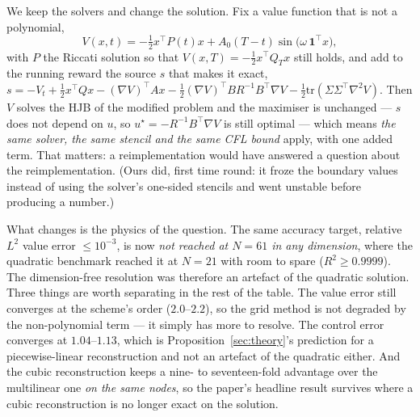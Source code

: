 \documentclass[conference]{IEEEtran}
\begin{document}
We keep the solvers and change the solution. Fix a value function that is not a polynomial,
\begin{equation}
V(x,t) = -\tfrac{1}{2}x^\top P(t)x + A_0 (T-t)\sin\!\big(\omega\,\mathbf{1}^\top x\big),
\end{equation}
with $P$ the Riccati solution so that $V(x,T) = -\tfrac12 x^\top Q_T x$ still holds, and add to the
running reward the source $s$ that makes it exact,
$s = -V_t + \tfrac12 x^\top Qx - (\nabla V)^\top Ax - \tfrac12(\nabla V)^\top BR^{-1}B^\top\nabla V
- \tfrac12\mathrm{tr}(\Sigma\Sigma^\top\nabla^2 V)$.
Then $V$ solves the HJB of the modified problem and the maximiser is unchanged --- $s$ does not
depend on $u$, so $u^\star = -R^{-1}B^\top\nabla V$ is still optimal --- which means \emph{the same
solver, the same stencil and the same CFL bound} apply, with one added term. That matters: a
reimplementation would have answered a question about the reimplementation. (Ours did, first time
round: it froze the boundary values instead of using the solver's one-sided stencils and went
unstable before producing a number.)

What changes is the physics of the question. The same accuracy target, relative $L^2$ value error
$\le 10^{-3}$, is now \emph{not reached at $N=61$ in any dimension}, where the quadratic benchmark
reached it at $N=21$ with room to spare ($R^2 \ge 0.9999$). The dimension-free resolution was
therefore an artefact of the quadratic solution. Three things are worth separating in the rest of
the table. The value error still converges at the scheme's order ($2.0$--$2.2$), so the grid method
is not degraded by the non-polynomial term --- it simply has more to resolve. The control error
converges at $1.04$--$1.13$, which is Proposition~\ref{sec:theory}'s prediction for a piecewise-linear
reconstruction and not an artefact of the quadratic either. And the cubic reconstruction keeps a
nine- to seventeen-fold advantage over the multilinear one \emph{on the same nodes}, so the paper's
headline result survives where a cubic reconstruction is no longer exact on the solution.
\end{document}
